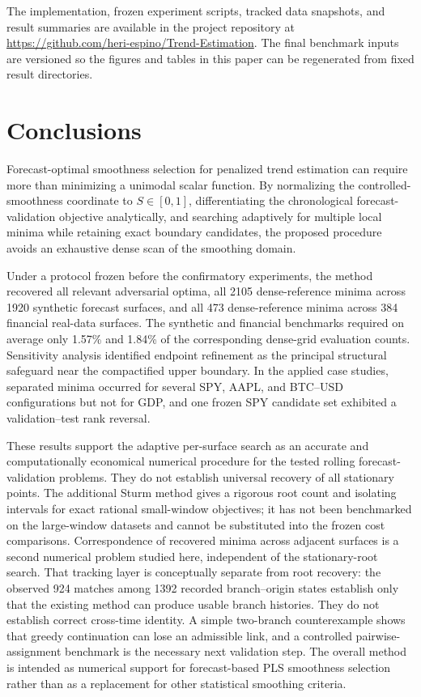\documentclass[english]{smcca}
\begin{document}
The implementation, frozen experiment scripts, tracked data snapshots, and result summaries are available in the project repository at \url{https://github.com/heri-espino/Trend-Estimation}. The final benchmark inputs are versioned so the figures and tables in this paper can be regenerated from fixed result directories.

\section{Conclusions}

Forecast-optimal smoothness selection for penalized trend estimation can require more than minimizing a unimodal scalar function. By normalizing the controlled-smoothness coordinate to \(S\in[0,1]\), differentiating the chronological forecast-validation objective analytically, and searching adaptively for multiple local minima while retaining exact boundary candidates, the proposed procedure avoids an exhaustive dense scan of the smoothing domain.

Under a protocol frozen before the confirmatory experiments, the method recovered all relevant adversarial optima, all 2105 dense-reference minima across 1920 synthetic forecast surfaces, and all 473 dense-reference minima across 384 financial real-data surfaces. The synthetic and financial benchmarks required on average only 1.57\% and 1.84\% of the corresponding dense-grid evaluation counts. Sensitivity analysis identified endpoint refinement as the principal structural safeguard near the compactified upper boundary. In the applied case studies, separated minima occurred for several SPY, AAPL, and BTC--USD configurations but not for GDP, and one frozen SPY candidate set exhibited a validation--test rank reversal.

These results support the adaptive per-surface search as an accurate and computationally economical numerical procedure for the tested rolling forecast-validation problems. They do not establish universal recovery of all stationary points. The additional Sturm method gives a rigorous root count and isolating intervals for exact rational small-window objectives; it has not been benchmarked on the large-window datasets and cannot be substituted into the frozen cost comparisons. Correspondence of recovered minima across adjacent surfaces is a second numerical problem studied here, independent of the stationary-root search. That tracking layer is conceptually separate from root recovery: the observed 924 matches among 1392 recorded branch--origin states establish only that the existing method can produce usable branch histories. They do not establish correct cross-time identity. A simple two-branch counterexample shows that greedy continuation can lose an admissible link, and a controlled pairwise-assignment benchmark is the necessary next validation step. The overall method is intended as numerical support for forecast-based PLS smoothness selection rather than as a replacement for other statistical smoothing criteria.



\end{document}
